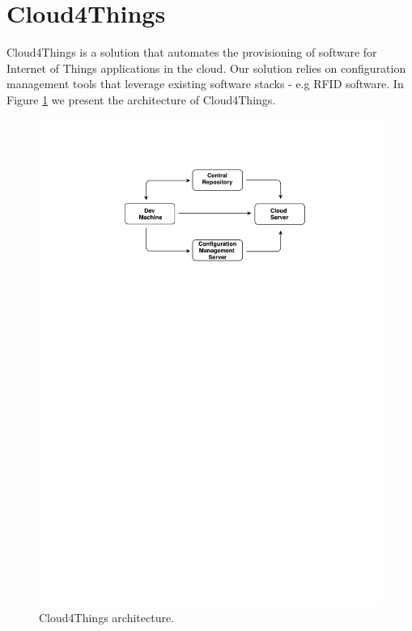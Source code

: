 \section{Cloud4Things}
\label{sec:solution}
Cloud4Things is a solution that automates the provisioning of software for Internet of Things
applications in the cloud. Our solution relies on configuration management tools that leverage
existing software stacks - e.g RFID software. In Figure \ref{fig:c4t_architecture} we present
the architecture of Cloud4Things.
\begin{figure}[!ht]
  \centering
  \includegraphics[width=.9\textwidth]{images/c4t-generic-solution}
  \caption{Cloud4Things architecture.}
  \label{fig:c4t_architecture}
\end{figure}

